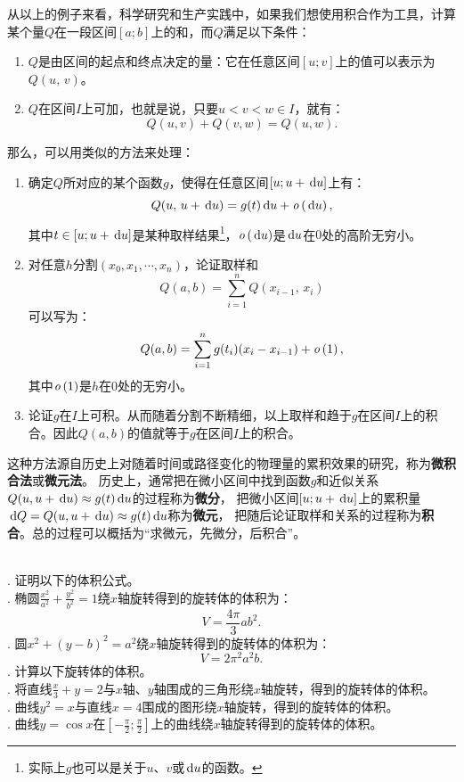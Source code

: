 \documentclass[12pt,UTF8,fontset=none]{ctexbook}
\begin{document}
从以上的例子来看，科学研究和生产实践中，如果我们想使用积合作为工具，计算某个量$Q$在一段区间$[a;b]$上的和，而$Q$满足以下条件：
\begin{enumerate}
    \item $Q$是由区间的起点和终点决定的量：它在任意区间$[u;v]$上的值可以表示为$Q(u,\, v)$。
    \item $Q$在区间$I$上可加，也就是说，只要$u < v < w \in I$，就有：
            $$ Q(u, v) + Q(v, w) = Q(u, w).$$
\end{enumerate}
那么，可以用类似的方法来处理：
\begin{enumerate}
    \item 确定$Q$所对应的某个函数$g$，使得在任意区间$[u;u + \,\mathrm{d}u]$上有：
    $$Q(u, \, u + \,\mathrm{d}u) = g(t)\,\mathrm{d}u + \mathit{o}\left(\,\mathrm{d}u\right),$$
    其中$t\in [u;u+ \,\mathrm{d}u]$是某种取样结果\footnote{实际上$g$也可以是关于$u$、$v$或$\,\mathrm{d}u$的函数。}，$\mathit{o}\left(\,\mathrm{d}u\right)$是$\,\mathrm{d}u$在$0$处的高阶无穷小。
    \item 对任意$h$\dash 分割$(x_0, x_1, \cdots, x_n)$，论证取样和
    $$Q(a, b) = \sum_{i=1}^n Q(x_{i-1},\, x_i)$$
    可以写为：
    $$Q(a, b) = \sum_{i=1}^n g(t_i)(x_i - x_{i-1}) + \mathit{o}\left(1\right),$$
    其中$\mathit{o}\left(1\right)$是$h$在$0$处的无穷小。
    \item 论证$g$在$I$上可积。从而随着分割不断精细，以上取样和趋于$g$在区间$I$上的积合。因此$Q(a, b)$的值就等于$g$在区间$I$上的积合。
\end{enumerate}
这种方法源自历史上对随着时间或路径变化的物理量的累积效果的研究，称为\textbf{微积合法}或\textbf{微元法}。
历史上，通常把在微小区间中找到函数$g$和近似关系$Q(u,u + \,\mathrm{d}u) \approx g(t)\,\mathrm{d}u$的过程称为\textbf{微分}，
把微小区间$[u;u+\,\mathrm{d}u]$上的累积量$\,\mathrm{d}Q = Q(u, u + \,\mathrm{d}u) \approx g(t)\,\mathrm{d}u$称为\textbf{微元}，
把随后论证取样和关系的过程称为\textbf{积合}。总的过程可以概括为“求微元，先微分，后积合”。


\begin{xt}
    \mbox{} \\
    . 证明以下的体积公式。\\
    . 椭圆$\displaystyle\frac{x^2}{a^2} + \frac{y^2}{b^2} = 1$绕$x$轴旋转得到的旋转体的体积为：
    $$ V = \frac{4\pi}{3} ab^2. $$
    . 圆$x^2 + (y - b)^2 = a^2$绕$x$轴旋转得到的旋转体的体积为：
    $$ V = 2\pi^2 a^2 b. $$
    . 计算以下旋转体的体积。\\
    . 将直线$\frac{x}{3} + y = 2$与$x$轴、$y$轴围成的三角形绕$x$轴旋转，得到的旋转体的体积。\\
    . 曲线$y^2 = x$与直线$x=4$围成的图形绕$x$轴旋转，得到的旋转体的体积。\\
    . 曲线$y = \cos{x}$在$\displaystyle\left[-\frac{\pi}{2};\frac{\pi}{2}\right]$上的曲线绕$x$轴旋转得到的旋转体的体积。
\end{xt}
\end{document}
